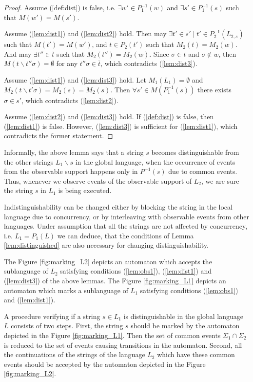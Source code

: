 \begin{proof}
Assume (\ref{def:dist}) is false, i.e. $\exists w' \in P_1^{-1}(w)$ and $\exists
s' \in P_1^{-1}(s)$ such that $M(w') = M(s')$. 

Assume (\ref{lem:dist1}) and (\ref{lem:dist2}) hold. Then may $\exists t' \in
\overline{s'} \mid t' \in P_2^{-1}(L_{2,s})$ such that $M(t') = M(w')$, and $t
\in P_2(t')$ such that $M_2(t) = M_2(w)$. And may $\exists t'' \in \overline{t}$
such that $M_2(t'') = M_2(w)$. Since $\sigma \in t$ and $\sigma \not \in w$,
then $M(t \backslash t''\sigma) = \emptyset$ for any $t''\sigma \in
\overline{t}$, which contradicts (\ref{lem:dist3}).

Assume (\ref{lem:dist1}) and (\ref{lem:dist3}) hold. Let $M_1(L_1) = \emptyset$
and $M_2(t\backslash t'\sigma) = M_2(s) = M_2(s)$. Then $\forall s' \in
M(P_1^{-1}(s))$ there exists $\sigma \in s'$, which contradicts
(\ref{lem:dist2}).

Assume (\ref{lem:dist2}) and (\ref{lem:dist3}) hold. If (\ref{def:dist}) is
false, then (\ref{lem:dist1}) is false. However, (\ref{lem:dist3}) is sufficient
for (\ref{lem:dist1}), which contradicts the former statement.
\end{proof}

Informally, the above lemma says that a string $s$ becomes distinguishable from
the other strings $L_1\backslash s$ in the global language, when the occurrence
of events from the observable support happens only in $P^{-1}(s)$ due to
common events. Thus, whenever we observe events of the observable support of
$L_2$, we are sure the string $s$ in $L_1$ is being executed.

Indistinguishability can be changed either by blocking the string in the local
language due to concurrency, or by interleaving with observable events from
other languages. Under assumption that all the strings are not affected by
concurrency, i.e. $L_1 = P_1(L)$ we can deduce, that the conditions of Lemma
\ref{lem:distinguished} are also necessary for changing distinguishability. 

The Figure \ref{fig:marking_L2} depicts an automaton which
accepts the sublanguage of $L_2$ satisfying conditions (\ref{lem:obs1}),
(\ref{lem:dist1}) and (\ref{lem:dist3}) of the above lemmas.
The Figure \ref{fig:marking_L1} depicts an automaton which
marks a sublanguage of $L_1$ satisfying conditions (\ref{lem:obs1}) and
(\ref{lem:dist1}). 

A procedure verifying if a string $s \in L_1$ is distinguishable in the global
language $L$ consists of two steps. First, the string $s$ should be marked by
the automaton depicted in the Figure \ref{fig:marking_L1}. Then the set of
common events $\Sigma_1 \cap \Sigma_2$ is reduced to the set of events causing
transitions in the automaton. Second, all the continuations of the strings of
the language $L_2$ which have these common events should be accepted by the
automaton depicted in the Figure
\ref{fig:marking_L2}.

